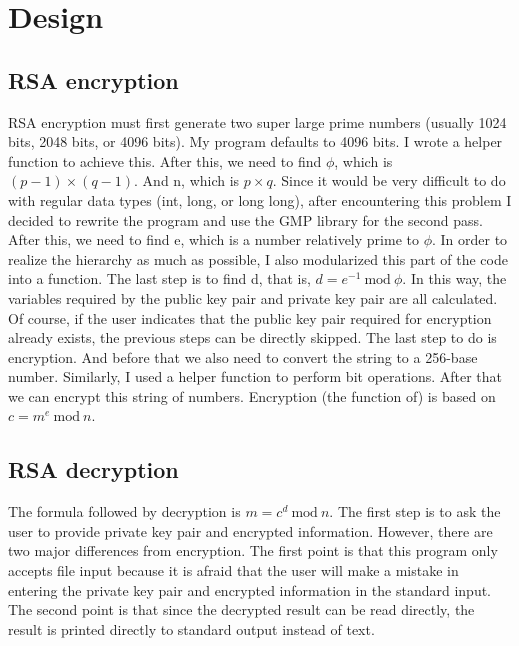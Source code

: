 \documentclass{article}
\begin{document}
\section{Design}
    \subsection{RSA encryption}
        RSA encryption must first generate two super large prime numbers (usually 1024 bits, 2048 bits, or 4096 bits). My program defaults to 4096 bits. I wrote a helper function to achieve this. After this, we need to find $\phi$, which is $(p-1)\times(q-1)$. And n, which is $p\times q$. Since it would be very difficult to do with regular data types (int, long, or long long), after encountering this problem I decided to rewrite the program and use the GMP library for the second pass. After this, we need to find e, which is a number relatively prime to $\phi$. In order to realize the hierarchy as much as possible, I also modularized this part of the code into a function. The last step is to find d, that is, $d = e^{-1}\ \mathrm{mod}\ \phi$. In this way, the variables required by the public key pair and private key pair are all calculated. Of course, if the user indicates that the public key pair required for encryption already exists, the previous steps can be directly skipped. The last step to do is encryption. And before that we also need to convert the string to a 256-base number. Similarly, I used a helper function to perform bit operations. After that we can encrypt this string of numbers. Encryption (the function of) is based on $c = m^e\ \mathrm{mod}\ n$.
    \subsection{RSA decryption}
    The formula followed by decryption is $m = c^d\ \mathrm{mod}\ n$. The first step is to ask the user to provide private key pair and encrypted information. However, there are two major differences from encryption. The first point is that this program only accepts file input because it is afraid that the user will make a mistake in entering the private key pair and encrypted information in the standard input. The second point is that since the decrypted result can be read directly, the result is printed directly to standard output instead of text.
\end{document}
